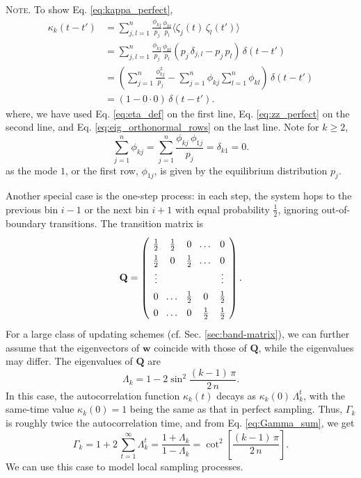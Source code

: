 \documentclass[reprint, floatfix]{revtex4-1}
\newcommand{\note}[1]{{\color{DarkGreen}\footnotesize \textsc{Note.} #1}}
\begin{document}
\note{To show Eq. \eqref{eq:kappa_perfect},
  $$
  \begin{aligned}
  \kappa_k(t - t')
  &=
  \sum_{j,l = 1}^n
  \frac{ \phi_{kj} } { p_j }
  \frac{ \phi_{kl} } { p_l }
  \langle \zeta_j(t) \, \zeta_l(t') \rangle
  \\
  &=
  \sum_{j,l = 1}^n
  \frac{ \phi_{kj} } { p_j }
  \frac{ \phi_{kl} } { p_l }
  \left(
    p_j \, \delta_{j, l} - p_j \, p_l
  \right)
  \, \delta(t - t')
  \\
  &=
  \left(
    \sum_{j = 1}^n
    \frac{ \phi_{kj}^2 } { p_j }
    -
    \sum_{j = 1}^n \phi_{kj}
    \sum_{l = 1}^n \phi_{kl}
  \right)
  \, \delta(t - t')
  \\
  &=
  (1 - 0 \cdot 0) \, \delta(t - t').
  \end{aligned}
  $$
  where,
  we have used
  Eq. \eqref{eq:eta_def}
  on the first line,
  Eq. \eqref{eq:zz_perfect}
  on the second line,
  and
  Eq. \eqref{eq:eig_orthonormal_rows}
  on the last line.
  Note for $k \ge 2$,
  $$
  \sum_{j = 1}^n \phi_{kj}
  =
  \sum_{j = 1}^n \frac{ \phi_{kj} \, \phi_{1j} } { p_j }
  =
  \delta_{k1}
  =
  0.
  $$
  as the mode $1$, or the first row, $\phi_{1j}$,
  is given by the equilibrium distribution $p_j$.
}


Another special case is the one-step process\cite{vankampen}:
in each step, the system hops to the previous bin $i - 1$
or the next bin $i + 1$ with equal probability $\frac 1 2$,
ignoring out-of-boundary transitions.
%
The transition matrix is
%
\begin{equation}
\arraycolsep=3.6pt\def\arraystretch{1.4}
\mathbf Q
=
\left(
  \begin{array}{cccccccc}
    \frac 1 2 & \frac 1 2 & 0 & \dots & 0 \\
    \frac 1 2 & 0         & \frac 1 2 & \dots & 0 \\
    \vdots & &  & & \vdots \\
    0 & \dots & \frac 1 2 & 0  & \frac 1 2 \\
    0 & \dots & 0 & \frac 1 2 & \frac 1 2
  \end{array}
\right).
\label{eq:T_nn}
\end{equation}
%
For a large class of updating schemes
(cf. Sec. \ref{sec:band-matrix}),
we can further assume that
the eigenvectors of $\mathbf w$
coincide with those of $\mathbf Q$,
while the eigenvalues may differ.
%
The eigenvalues of $\mathbf Q$ are
$$
\Lambda_k = 1 - 2 \sin^2 \frac{ (k - 1) \, \pi } { 2 \, n }.
$$
%
In this case,
the autocorrelation function $\kappa_k(t)$
decays as $\kappa_k(0) \, \Lambda_k^t$,
with the same-time value
$\kappa_k(0) = 1$
being the same as
that in perfect sampling.
%
Thus,
$\Gamma_k$ is roughly twice
the autocorrelation time,
and from Eq. \eqref{eq:Gamma_sum}, we get
%
\begin{equation}
\Gamma_k
=
1 + 2 \, \sum_{t = 1}^\infty \Lambda_k^t
=
\frac{ 1 + \Lambda_k } { 1 - \Lambda_k }
=
\cot^2 \left[ \frac{ (k - 1) \, \pi } { 2 \, n } \right].
\label{eq:Gamma_onestep}
\end{equation}
%
We can use this case to model local sampling processes.
\end{document}
